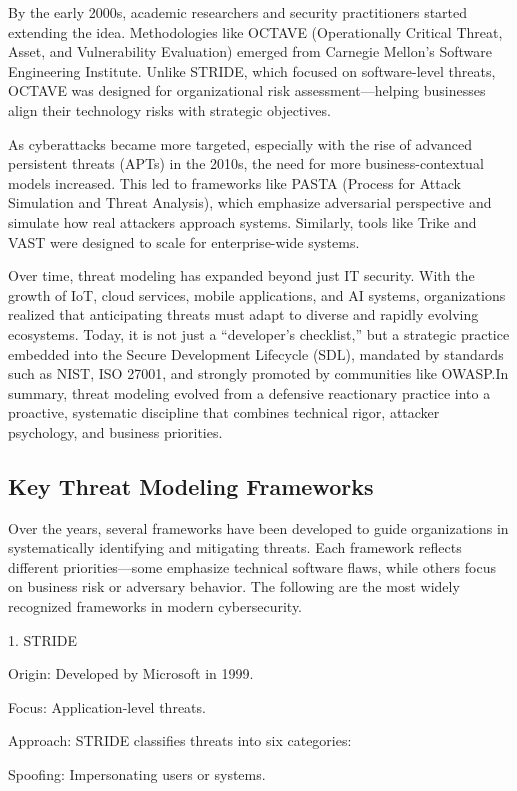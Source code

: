 \documentclass{article}
\begin{document}
By the early 2000s, academic researchers and security practitioners started extending the idea. Methodologies like OCTAVE (Operationally Critical Threat, Asset, and Vulnerability Evaluation) emerged from Carnegie Mellon’s Software Engineering Institute. Unlike STRIDE, which focused on software-level threats, OCTAVE was designed for organizational risk assessment—helping businesses align their technology risks with strategic objectives.

As cyberattacks became more targeted, especially with the rise of advanced persistent threats (APTs) in the 2010s, the need for more business-contextual models increased. This led to frameworks like PASTA (Process for Attack Simulation and Threat Analysis), which emphasize adversarial perspective and simulate how real attackers approach systems. Similarly, tools like Trike and VAST were designed to scale for enterprise-wide systems.

Over time, threat modeling has expanded beyond just IT security. With the growth of IoT, cloud services, mobile applications, and AI systems, organizations realized that anticipating threats must adapt to diverse and rapidly evolving ecosystems. Today, it is not just a “developer’s checklist,” but a strategic practice embedded into the Secure Development Lifecycle (SDL), mandated by standards such as NIST, ISO 27001, and strongly promoted by communities like OWASP.In summary, threat modeling evolved from a defensive reactionary practice into a proactive, systematic discipline that combines technical rigor, attacker psychology, and business priorities.
\subsection{Key Threat Modeling Frameworks}
Over the years, several frameworks have been developed to guide organizations in systematically identifying and mitigating threats. Each framework reflects different priorities—some emphasize technical software flaws, while others focus on business risk or adversary behavior. The following are the most widely recognized frameworks in modern cybersecurity.

1. STRIDE

Origin: Developed by Microsoft in 1999.

Focus: Application-level threats.

Approach: STRIDE classifies threats into six categories:

Spoofing: Impersonating users or systems.
\end{document}
